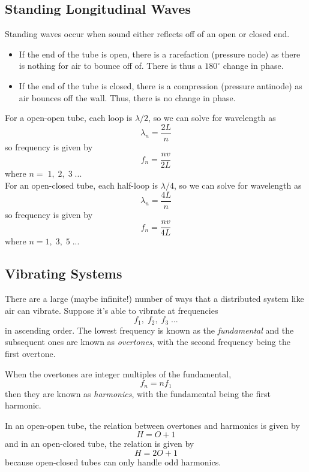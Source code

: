 \documentclass[../PhysicsFormulae.tex]{subfiles}
\begin{document}
\subsection{Standing Longitudinal Waves}
Standing waves occur when sound either reflects off of an open or closed end. 
\begin{itemize}
    \item If the end of the tube is open, there is a rarefaction (pressure node) as there is nothing for air to bounce off of. There is thus a $180^{\circ}$ change in phase. 
    \item If the end of the tube is closed, there is a compression (pressure antinode) as air bounces off the wall. Thus, there is no change in phase.
\end{itemize}
For a open-open tube, each loop is $\lambda/2$, so we can solve for wavelength as 
\[ \lambda_n = \frac{2L}{n} \]
so frequency is given by 
\[ f_n = \frac{nv}{2L} \]
where $n = \;1,\;2,\;3\;...$ \\
For an open-closed tube, each half-loop is $\lambda/4$, so we can solve for wavelength as 
\[ \lambda_n = \frac{4L}{n} \]
so frequency is given by 
\[ f_n = \frac{nv}{4L} \]
where $n = 1,\;3,\;5\;...$

\subsection{Vibrating Systems}
There are a large (maybe infinite!) number of ways that a distributed system like air can vibrate. Suppose it's able to vibrate at frequencies 
\[ f_1, \; f_2, \; f_3 \; ... \]
in ascending order. The lowest frequency is known as the \textit{fundamental} and the subsequent ones are known as \textit{overtones}, with the second frequency being the first overtone. \bigskip

When the overtones are integer multiples of the fundamental, 
\[ f_n = nf_1 \]
then they are known as \textit{harmonics}, with the fundamental being the first harmonic. \bigskip

In an open-open tube, the relation between overtones and harmonics is given by
\[ H = O + 1 \]
and in an open-closed tube, the relation is given by
\[ H = 2O +1 \]
because open-closed tubes can only handle odd harmonics. 
\end{document}
